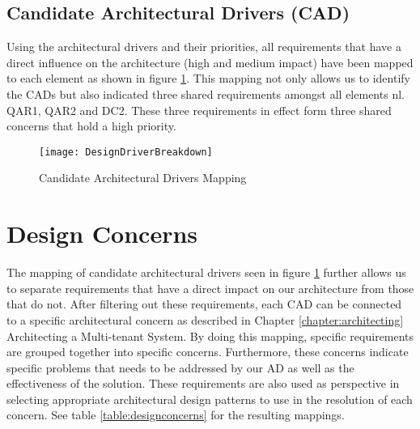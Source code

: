 \subsection{Candidate Architectural Drivers (CAD)}
Using the architectural drivers and their priorities, all requirements that have a direct influence on the architecture (high and medium impact) have been mapped to each element as shown in figure \ref{fig:designconcernmapping}. This mapping not only allows us to identify the CADs but also indicated three shared requirements amongst all elements nl. QAR1, QAR2 and DC2. These three requirements in effect form three shared concerns that hold a high priority.


\begin{figure}
\centering
\texttt{[image: DesignDriverBreakdown]}
\caption{Candidate Architectural Drivers Mapping}
\label{fig:designconcernmapping}
\end{figure}

\section{Design Concerns}
\label{sec:designconcerns}
The mapping of candidate architectural drivers seen in figure \ref{fig:designconcernmapping} further allows us to separate requirements that have a direct impact on our architecture from those that do not. After filtering out these requirements, each CAD can be connected to a specific architectural concern as described in Chapter \ref{chapter:architecting} Architecting a Multi-tenant System. By doing this mapping, specific requirements are grouped together into specific concerns. Furthermore, these concerns indicate specific problems that needs to be addressed by our AD as well as the effectiveness of the solution. These requirements are also used as perspective in selecting appropriate architectural design patterns to use in the resolution of each concern. See table \ref{table:designconcerns} for the resulting mappings. 


